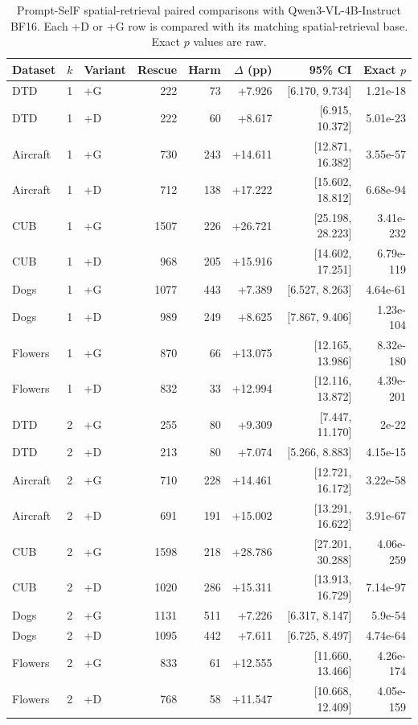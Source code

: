 \documentclass[10pt,twocolumn,letterpaper]{article}
\begin{document}
\begin{table}[t]
\caption{Prompt-SelF spatial-retrieval paired comparisons with Qwen3-VL-4B-Instruct BF16. Each +D or +G row is compared with its matching spatial-retrieval base. Exact $p$ values are raw.}
\label{sup:promptself_paired}
\centering\small\setlength{\tabcolsep}{6pt}
\begin{tabular}{lllrrrrr}
\toprule
Dataset & $k$ & Variant & Rescue & Harm & $\Delta$ (pp) & 95\% CI & Exact $p$ \\
\midrule
DTD & 1 & +G & 222 & 73 & +7.926 & [6.170, 9.734] & 1.21e-18 \\
DTD & 1 & +D & 222 & 60 & +8.617 & [6.915, 10.372] & 5.01e-23 \\
Aircraft & 1 & +G & 730 & 243 & +14.611 & [12.871, 16.382] & 3.55e-57 \\
Aircraft & 1 & +D & 712 & 138 & +17.222 & [15.602, 18.812] & 6.68e-94 \\
CUB & 1 & +G & 1507 & 226 & +26.721 & [25.198, 28.223] & 3.41e-232 \\
CUB & 1 & +D & 968 & 205 & +15.916 & [14.602, 17.251] & 6.79e-119 \\
Dogs & 1 & +G & 1077 & 443 & +7.389 & [6.527, 8.263] & 4.64e-61 \\
Dogs & 1 & +D & 989 & 249 & +8.625 & [7.867, 9.406] & 1.23e-104 \\
Flowers & 1 & +G & 870 & 66 & +13.075 & [12.165, 13.986] & 8.32e-180 \\
Flowers & 1 & +D & 832 & 33 & +12.994 & [12.116, 13.872] & 4.39e-201 \\
DTD & 2 & +G & 255 & 80 & +9.309 & [7.447, 11.170] & 2e-22 \\
DTD & 2 & +D & 213 & 80 & +7.074 & [5.266, 8.883] & 4.15e-15 \\
Aircraft & 2 & +G & 710 & 228 & +14.461 & [12.721, 16.172] & 3.22e-58 \\
Aircraft & 2 & +D & 691 & 191 & +15.002 & [13.291, 16.622] & 3.91e-67 \\
CUB & 2 & +G & 1598 & 218 & +28.786 & [27.201, 30.288] & 4.06e-259 \\
CUB & 2 & +D & 1020 & 286 & +15.311 & [13.913, 16.729] & 7.14e-97 \\
Dogs & 2 & +G & 1131 & 511 & +7.226 & [6.317, 8.147] & 5.9e-54 \\
Dogs & 2 & +D & 1095 & 442 & +7.611 & [6.725, 8.497] & 4.74e-64 \\
Flowers & 2 & +G & 833 & 61 & +12.555 & [11.660, 13.466] & 4.26e-174 \\
Flowers & 2 & +D & 768 & 58 & +11.547 & [10.668, 12.409] & 4.05e-159 \\
\bottomrule
\end{tabular}
\end{table}
\end{document}

